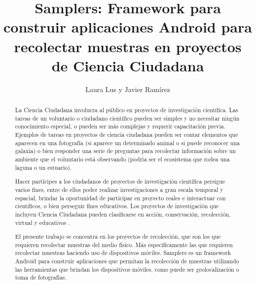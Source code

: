 \documentclass[11pt]{report}
\title{Samplers: Framework para construir aplicaciones Android para recolectar muestras en proyectos de Ciencia Ciudadana}
\author{Laura Lus y Javier Ramírez}
\begin{document}
\maketitle

\begin{abstract}

La Ciencia Ciudadana involucra al público en proyectos de investigación científica. Las tareas de un voluntario o ciudadano científico pueden ser simples y no necesitar ningún conocimiento especial, o pueden ser más complejas y requerir capacitación previa. Ejemplos de tareas en proyectos de ciencia ciudadana pueden ser contar elementos que aparecen en una fotografía (si aparece un determinado animal o si puede reconocer una galaxia) o bien responder una serie de preguntas para recolectar información sobre un ambiente que el voluntario está observando (podría ser el ecosistema que rodea una laguna o un estuario). 

Hacer partícipes a los ciudadanos de proyectos de investigación científica persigue varios fines, entre de ellos poder realizar investigaciones a gran escala temporal y espacial\cite{bonney2009citizen}, brindar la oportunidad de participar en proyecto reales e interactuar con científicos, o bien perseguir fines educativos. Los proyectos de investigación que incluyen Ciencia Ciudadana pueden clasificarse en acción, conservación, recolección, virtual y educativos \cite{wiggins2011conservation}. 

El presente trabajo se concentra en los proyectos de recolección, que son los que requieren recolectar muestras del medio físico. Más específicamente las que requieren recolectar muestras haciendo uso de dispositivos móviles. 
Samplers es un framework Android para construir aplicaciones que permitan la recolección de muestras utilizando las herramientas que brindan los dispositivos móviles, como puede ser geolocalización o toma de fotografías.

\end{abstract}

\tableofcontents

\end{document}
